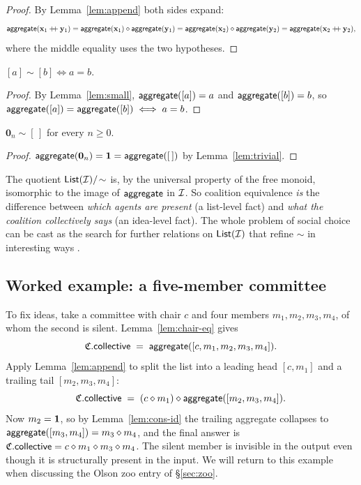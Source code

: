 \begin{proof}
By Lemma~\ref{lem:append} both sides expand:
\[
  \mathsf{aggregate}(\mathbf{x}_1 \mathbin{+\!\!+} \mathbf{y}_1) = \mathsf{aggregate}(\mathbf{x}_1) \mathbin{\diamond}
  \mathsf{aggregate}(\mathbf{y}_1) = \mathsf{aggregate}(\mathbf{x}_2) \mathbin{\diamond} \mathsf{aggregate}(\mathbf{y}_2) =
  \mathsf{aggregate}(\mathbf{x}_2 \mathbin{+\!\!+} \mathbf{y}_2),
\]
where the middle equality uses the two hypotheses.
\end{proof}

\begin{proposition}\label{prop:single-equiv}
$[a] \sim [b] \iff a = b$.
\end{proposition}

\begin{proof}
By Lemma~\ref{lem:small}, $\mathsf{aggregate}([a]) = a$ and $\mathsf{aggregate}([b])
= b$, so $\mathsf{aggregate}([a]) = \mathsf{aggregate}([b]) \iff a = b$.
\end{proof}

\begin{corollary}\label{cor:trivial-empty}
$\mathbf{0}_n \sim [\,]$ for every $n \geq 0$.
\end{corollary}

\begin{proof}
$\mathsf{aggregate}(\mathbf{0}_n) = \mathbf{1} = \mathsf{aggregate}([\,])$ by
Lemma~\ref{lem:trivial}.
\end{proof}

\begin{remark}
The quotient $\mathsf{List}(\mathcal{I})/\!\sim$ is, by the universal property of
the free monoid, isomorphic to the image of $\mathsf{aggregate}$ in
$\mathcal{I}$. So coalition equivalence \emph{is} the difference between
\emph{which agents are present} (a list-level fact) and \emph{what
the coalition collectively says} (an idea-level fact). The whole
problem of social choice can be cast as the search for further
relations on $\mathsf{List}(\mathcal{I})$ that refine $\sim$ in interesting ways
\cite{Arrow1951, Sen1970}.
\end{remark}

\subsection*{Worked example: a five-member committee}

To fix ideas, take a committee with chair $c$ and four members $m_1,
m_2, m_3, m_4$, of whom the second is silent. Lemma~\ref{lem:chair-eq}
gives
\[
  \mathfrak{C}.\mathsf{collective} \;=\; \mathsf{aggregate}([c, m_1, m_2, m_3, m_4]).
\]
Apply Lemma~\ref{lem:append} to split the list into a leading head
$[c, m_1]$ and a trailing tail $[m_2, m_3, m_4]$:
\[
  \mathfrak{C}.\mathsf{collective} \;=\; (c \mathbin{\diamond} m_1) \mathbin{\diamond} \mathsf{aggregate}([m_2,
  m_3, m_4]).
\]
Now $m_2 = \mathbf{1}$, so by Lemma~\ref{lem:cons-id} the trailing aggregate
collapses to $\mathsf{aggregate}([m_3, m_4]) = m_3 \mathbin{\diamond} m_4$, and the
final answer is $\mathfrak{C}.\mathsf{collective} = c \mathbin{\diamond} m_1 \mathbin{\diamond} m_3
\mathbin{\diamond} m_4$. The silent member is invisible in the output even
though it is structurally present in the input. We will return to this
example when discussing the Olson zoo entry of \S\ref{sec:zoo}.


